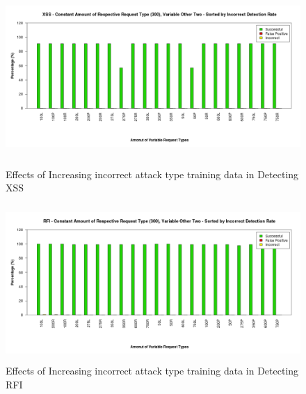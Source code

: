 \begin{appendices}
\begin{figure}[hp]
	\centering
	\includegraphics[height=225px]{./assets/appendix/fullresults/svm/incorrect/Results_XSS.png}
	\caption{Effects of Increasing incorrect attack type training data in Detecting XSS}
	\includegraphics[height=225px]{./assets/appendix/fullresults/svm/incorrect/Results_RFI.png}
	\caption{Effects of Increasing incorrect attack type training data in Detecting RFI}
\end{figure}

\end{appendices}
